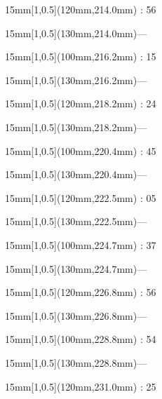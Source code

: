 \documentclass[a4paper]{memoir}
\begin{document}
\begin{textblock*}{15mm}[1,0.5](120mm,214.0mm) : 56\end{textblock*}
\begin{textblock*}{15mm}[1,0.5](130mm,214.0mm)\flushright —\end{textblock*}
\begin{textblock*}{15mm}[1,0.5](100mm,216.2mm) : 15\end{textblock*}
\begin{textblock*}{15mm}[1,0.5](130mm,216.2mm)\flushright —\end{textblock*}
\begin{textblock*}{15mm}[1,0.5](120mm,218.2mm) : 24\end{textblock*}
\begin{textblock*}{15mm}[1,0.5](130mm,218.2mm)\flushright —\end{textblock*}
\begin{textblock*}{15mm}[1,0.5](100mm,220.4mm) : 45\end{textblock*}
\begin{textblock*}{15mm}[1,0.5](130mm,220.4mm)\flushright —\end{textblock*}
\begin{textblock*}{15mm}[1,0.5](120mm,222.5mm) : 05\end{textblock*}
\begin{textblock*}{15mm}[1,0.5](130mm,222.5mm)\flushright —\end{textblock*}
\begin{textblock*}{15mm}[1,0.5](100mm,224.7mm) : 37\end{textblock*}
\begin{textblock*}{15mm}[1,0.5](130mm,224.7mm)\flushright —\end{textblock*}
\begin{textblock*}{15mm}[1,0.5](120mm,226.8mm) : 56\end{textblock*}
\begin{textblock*}{15mm}[1,0.5](130mm,226.8mm)\flushright —\end{textblock*}
\begin{textblock*}{15mm}[1,0.5](100mm,228.8mm) : 54\end{textblock*}
\begin{textblock*}{15mm}[1,0.5](130mm,228.8mm)\flushright —\end{textblock*}
\begin{textblock*}{15mm}[1,0.5](120mm,231.0mm) : 25\end{textblock*}
\end{document}
